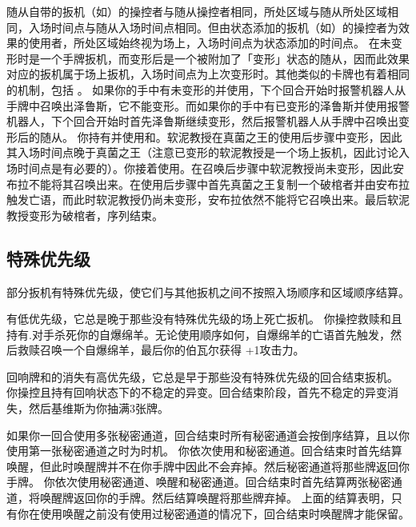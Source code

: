 随从自带的扳机（如）的操控者与随从操控者相同，所处区域与随从所处区域相同，入场时间点与随从入场时间点相同。但由状态添加的扳机（如）的操控者为效果的使用者，所处区域始终视为场上，入场时间点为状态添加的时间点。
\notice {}在未变形时是一个手牌扳机，而变形后是一个被附加了「变形」状态的随从，因而此效果对应的扳机属于场上扳机，入场时间点为上次变形时。其他类似的卡牌也有着相同的机制，包括 。
\example 如果你的手中有未变形的并使用，下个回合开始时报警机器人从手牌中召唤出泽鲁斯，它不能变形。而如果你的手中有已变形的泽鲁斯并使用报警机器人，下个回合开始时首先泽鲁斯继续变形，然后报警机器人从手牌中召唤出变形后的随从。
\example 你持有并使用和。软泥教授在真菌之王的使用后步骤中变形，因此其入场时间点晚于真菌之王（注意已变形的软泥教授是一个场上扳机，因此讨论入场时间点是有必要的）。你接着使用。在召唤后步骤中软泥教授尚未变形，因此安布拉不能将其召唤出来。在使用后步骤中首先真菌之王复制一个破棺者并由安布拉触发亡语，而此时软泥教授仍尚未变形，安布拉依然不能将它召唤出来。最后软泥教授变形为破棺者，序列结束。

\subsection{特殊优先级}
\label{special-priority}

部分扳机有特殊优先级，使它们与其他扳机之间不按照入场顺序和区域顺序结算。

有低优先级，它总是晚于那些没有特殊优先级的场上死亡扳机。
\example 你操控救赎和且持有.对手杀死你的自爆绵羊。无论使用顺序如何，自爆绵羊的亡语首先触发，然后救赎召唤一个自爆绵羊，最后你的伯瓦尔获得 +1攻击力。

回响牌和的消失有高优先级，它总是早于那些没有特殊优先级的回合结束扳机。
\example 你操控且持有回响状态下的不稳定的异变。回合结束阶段，首先不稳定的异变消失，然后基维斯为你抽满3张牌。

如果你一回合使用多张秘密通道，回合结束时所有秘密通道会按倒序结算，且以你使用第一张秘密通道之时为时机。
\example 你依次使用和秘密通道。回合结束时首先结算唤醒，但此时唤醒牌并不在你手牌中因此不会弃掉。然后秘密通道将那些牌返回你手牌。
\example 你依次使用秘密通道、唤醒和秘密通道。回合结束时首先结算两张秘密通道，将唤醒牌返回你的手牌。然后结算唤醒将那些牌弃掉。
\notice 上面的结算表明，只有你在使用唤醒之前没有使用过秘密通道的情况下，回合结束时唤醒牌才能保留。

